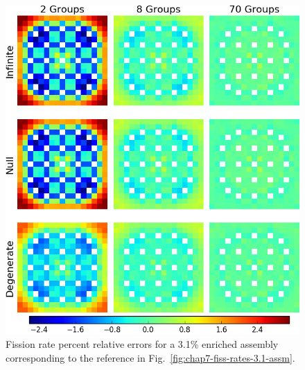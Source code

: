 \begin{figure}[h!]
\centering
\includegraphics[width=\linewidth]{figures/quantification/assm-31/fiss-err}
\caption[Fission rate errors for a 3.1\% enriched assembly]{Fission rate percent relative errors for a 3.1\% enriched assembly corresponding to the reference in Fig.~\ref{fig:chap7-fiss-rates-3.1-assm}.}
\label{fig:chap8-assm-3.1-fiss-err}
\end{figure}

\clearpage

